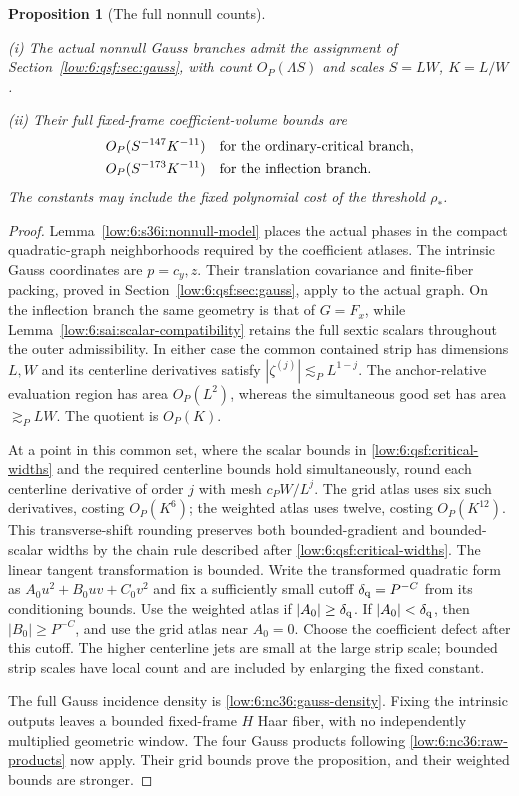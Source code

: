 \documentclass[11pt]{amsart}
\newtheorem{proposition}[theorem]{Proposition}
\theoremstyle{definition}
\theoremstyle{remark}
\numberwithin{equation}{section}
\begin{document}
\begin{proposition}[The full nonnull counts]\label{low:6:s36i:nonnull-count}

\noindent\textup{(i)} The actual nonnull Gauss branches admit the assignment of Section~\ref{low:6:qsf:sec:gauss}, with count $O_P(\Lambda S)$ and scales $S=LW$, $K=L/W$.

\noindent\textup{(ii)} Their full fixed-frame coefficient-volume bounds are
\[
\begin{aligned}
&O_P(S^{-147}K^{-11})&&\hbox{for the ordinary-critical branch},\\
&O_P(S^{-173}K^{-11})&&\hbox{for the inflection branch}.
\end{aligned}
\]
The constants may include the fixed polynomial cost of the threshold $\rho_*$. 
\end{proposition}
\begin{proof}
Lemma~\ref{low:6:s36i:nonnull-model} places the actual phases in the compact quadratic-graph neighborhoods required by the coefficient atlases. The intrinsic Gauss coordinates are $p=c_y,z$. Their translation covariance and finite-fiber packing, proved in Section~\ref{low:6:qsf:sec:gauss}, apply to the actual graph. On the inflection branch the same geometry is that of $G=F_x$, while Lemma~\ref{low:6:sai:scalar-compatibility} retains the full sextic scalars throughout the outer admissibility. In either case the common contained strip has dimensions $L,W$ and its centerline derivatives satisfy $|\zeta^{(j)}|\lesssim_PL^{1-j}$. The anchor-relative evaluation region has area $O_P(L^2)$, whereas the simultaneous good set has area $\gtrsim_PLW$. The quotient is $O_P(K)$.

At a point in this common set, where the scalar bounds in \eqref{low:6:qsf:critical-widths} and the required centerline bounds hold simultaneously, round each centerline derivative of order $j$ with mesh $c_PW/L^j$. The grid atlas uses six such derivatives, costing $O_P(K^6)$; the weighted atlas uses twelve, costing $O_P(K^{12})$. This transverse-shift rounding preserves both bounded-gradient and bounded-scalar widths by the chain rule described after \eqref{low:6:qsf:critical-widths}. The linear tangent transformation is bounded. Write the transformed quadratic form as $A_0u^2+B_0uv+C_0v^2$ and fix a sufficiently small cutoff $\delta_{\rm q}=P^{-C}$ from its conditioning bounds. Use the weighted atlas if $|A_0|\ge\delta_{\rm q}$. If $|A_0|<\delta_{\rm q}$, then $|B_0|\ge P^{-C}$, and use the grid atlas near $A_0=0$. Choose the coefficient defect after this cutoff. The higher centerline jets are small at the large strip scale; bounded strip scales have local count and are included by enlarging the fixed constant.

The full Gauss incidence density is \eqref{low:6:nc36:gauss-density}. Fixing the intrinsic outputs leaves a bounded fixed-frame $H$ Haar fiber, with no independently multiplied geometric window. The four Gauss products following \eqref{low:6:nc36:raw-products} now apply. Their grid bounds prove the proposition, and their weighted bounds are stronger. 
\end{proof}
\end{document}
